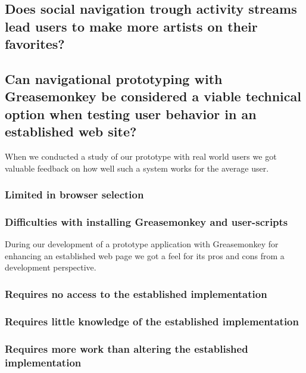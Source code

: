 \subsection{%
  Does social navigation trough activity streams lead users to make
  more artists on \urort{} their favorites?
}

\subsection{%
  Can navigational prototyping with Greasemonkey be considered a
  viable technical option when testing user behavior in an
  established web site?
}

When we conducted a study of our prototype with real world users
we got valuable feedback on how well such a system works for the average user.

\subsubsection{Limited in browser selection}


\subsubsection{Difficulties with installing Greasemonkey and user-scripts}


\parabreak

During our development of a prototype application with Greasemonkey for
enhancing an established web page we got a feel for its pros and cons from a
development perspective.

\subsubsection{Requires no access to the established implementation}

\subsubsection{Requires little knowledge of the established implementation}

\subsubsection{Requires more work than altering the established
  implementation}

